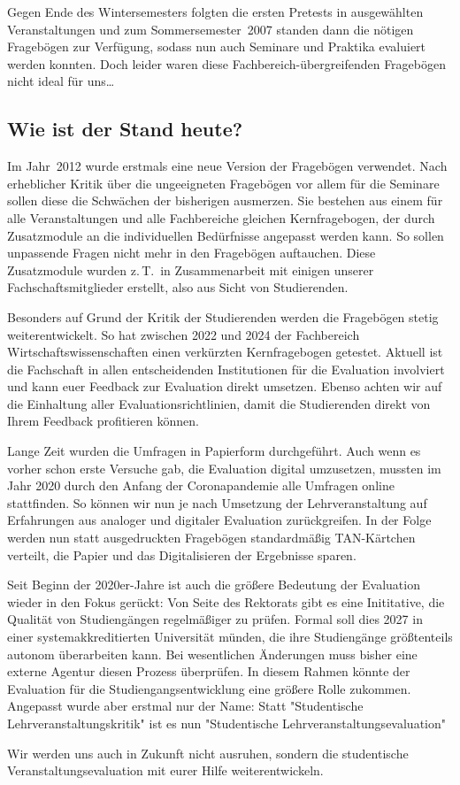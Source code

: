 \begin{multicols}{2}
Gegen Ende des Wintersemesters folgten die ersten Pretests in ausgewählten Veranstaltungen und zum Sommersemester~2007 standen dann die nötigen Fragebögen zur Verfügung, sodass nun auch Seminare und Praktika evaluiert werden konnten.
Doch leider waren diese Fachbereich-übergreifenden Fragebögen nicht ideal für uns\dots

\subsection{Wie ist der Stand heute?}
Im Jahr~2012 wurde erstmals eine neue Version der Fragebögen verwendet.
Nach erheblicher Kritik über die ungeeigneten Fragebögen vor allem für die Seminare sollen diese die Schwächen der bisherigen ausmerzen.
Sie bestehen aus einem für alle Veranstaltungen und alle Fachbereiche gleichen Kernfragebogen, der durch Zusatzmodule an die individuellen Bedürfnisse angepasst werden kann.
So sollen unpassende Fragen nicht mehr in den Fragebögen auftauchen.
Diese Zusatzmodule wurden z.\,T.\ in Zusammenarbeit mit einigen unserer Fachschaftsmitglieder erstellt, also aus Sicht von Studierenden.

Besonders auf Grund der Kritik der Studierenden werden die Fragebögen stetig weiterentwickelt.
So hat zwischen 2022 und 2024 der Fachbereich Wirtschaftswissenschaften einen verkürzten Kernfragebogen getestet.
Aktuell ist die Fachschaft in allen entscheidenden Institutionen für die Evaluation involviert und kann euer Feedback zur Evaluation direkt umsetzen.
Ebenso achten wir auf die Einhaltung aller Evaluationsrichtlinien, damit die Studierenden direkt von Ihrem Feedback profitieren können.

Lange Zeit wurden die Umfragen in Papierform durchgeführt. Auch wenn es vorher schon erste Versuche gab, die Evaluation digital umzusetzen, mussten im Jahr 2020 durch den Anfang der Coronapandemie alle Umfragen online stattfinden. So können wir nun je nach Umsetzung der Lehrveranstaltung auf Erfahrungen aus analoger und digitaler Evaluation zurückgreifen. In der Folge werden nun statt ausgedruckten Fragebögen standardmäßig TAN-Kärtchen verteilt, die Papier und das Digitalisieren der Ergebnisse sparen.

Seit Beginn der 2020er-Jahre ist auch die größere Bedeutung der Evaluation wieder in den Fokus gerückt: Von Seite des Rektorats gibt es eine Inititative, die Qualität von Studiengängen regelmäßiger zu prüfen. Formal soll dies 2027 in einer systemakkreditierten Universität münden, die ihre Studiengänge größtenteils autonom überarbeiten kann. Bei wesentlichen Änderungen muss bisher eine externe Agentur diesen Prozess überprüfen. In diesem Rahmen könnte der Evaluation für die Studiengangsentwicklung eine größere Rolle zukommen. Angepasst wurde aber erstmal nur der Name: Statt "Studentische Lehrveranstaltungskritik" ist es nun "Studentische Lehrveranstaltungsevaluation"

Wir werden uns auch in Zukunft nicht ausruhen, sondern die studentische Veranstaltungsevaluation mit eurer Hilfe weiterentwickeln.

\end{multicols}
